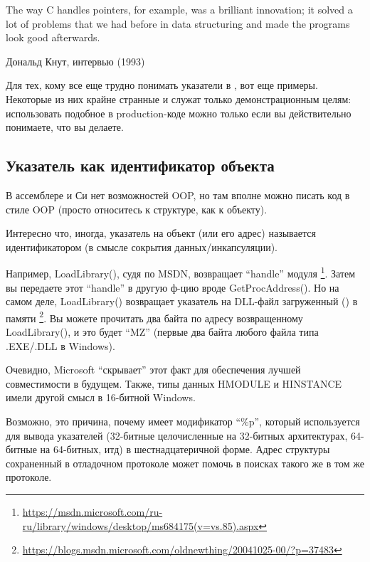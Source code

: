 \myindex{\CLanguageElements!\Pointers}
\label{label_pointers}

\epigraph{The way C handles pointers, for example, was a brilliant innovation;
it solved a lot of problems that we had before in data structuring and
made the programs look good afterwards.}{Дональд Кнут, интервью (1993)}

Для тех, кому все еще трудно понимать указатели в \CCpp{}, вот еще примеры.
Некоторые из них крайне странные и служат только демонстрационным целям:
использовать подобное в production-коде можно только если вы действительно понимаете, что вы делаете.








\subsection{Указатель как идентификатор объекта}

В ассемблере и Си нет возможностей \ac{OOP}, но там вполне можно писать код в стиле \ac{OOP}
(просто относитесь к структуре, как к объекту).

Интересно что, иногда, указатель на объект (или его адрес) называется идентификатором (в смысле сокрытия данных/инкапсуляции).

Например, LoadLibrary(), судя по \ac{MSDN}, возвращает ``handle'' модуля
\footnote{\url{https://msdn.microsoft.com/ru-ru/library/windows/desktop/ms684175(v=vs.85).aspx}}.
Затем вы передаете этот ``handle'' в другую ф-цию вроде GetProcAddress().
Но на самом деле, LoadLibrary() возвращает указатель на DLL-файл загруженный () в памяти
\footnote{\url{https://blogs.msdn.microsoft.com/oldnewthing/20041025-00/?p=37483}}.
Вы можете прочитать два байта по адресу возвращенному LoadLibrary(), и это будет ``MZ'' (первые два байта любого файла
типа .EXE/.DLL в Windows).

Очевидно, Microsoft ``скрывает'' этот факт для обеспечения лучшей совместимости в будущем.
Также, типы данных HMODULE и HINSTANCE имели другой смысл в 16-битной Windows.

Возможно, это причина, почему \printf имеет модификатор ``\%p'', который используется для вывода указателей (32-битные
целочисленные на 32-битных архитектурах, 64-битные на 64-битных, итд) в шестнадцатеричной форме.
Адрес структуры сохраненный в отладочном протоколе может помочь в поисках такого же в том же протоколе.

